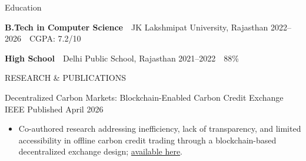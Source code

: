 \documentclass{resume} %
\begin{document}
\begin{rSection}{Education}

\textbf{B.Tech in Computer Science}
\,\textbar\,
JK Lakshmipat University, Rajasthan
\hfill
2022--2026
\,\textbar\,
CGPA: 7.2/10

\vspace{6pt}

\textbf{High School}
\,\textbar\,
Delhi Public School, Rajasthan
\hfill
2021--2022
\,\textbar\,
88\%

\end{rSection}


\begin{rSection}{RESEARCH \& PUBLICATIONS}

\setlength{\parskip}{6pt}
\setlength{\parindent}{2pt}

\experienceHeading
{Decentralized Carbon Markets: Blockchain-Enabled Carbon Credit Exchange}
{IEEE}
{}
{Published April 2026}

\begin{itemize}
    \itemsep -3pt {}

    \item Co-authored research addressing inefficiency, lack of transparency, and limited accessibility in offline carbon credit trading through a blockchain-based decentralized exchange design; \href{https://ieeexplore.ieee.org/document/11471701}{available here}.

\end{itemize}

\end{rSection}

\end{document}
